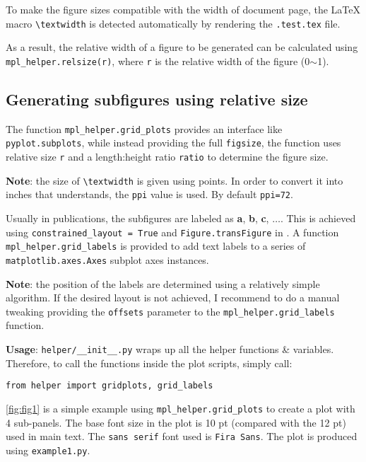 To make the figure sizes compatible with the width of document page,
the \LaTeX{} macro \verb|\textwidth| is detected automatically by
rendering the \verb|.test.tex| file.


{\allowbreak
  As a result, the relative width of a figure to be generated can be
calculated using \verb|mpl_helper.relsize(r)|, where \texttt{r} is the
relative width of the figure (0$\sim{}$1).
\par}

\subsection{Generating subfigures using relative size}
\label{sec:gener-subf}

The function \verb|mpl_helper.grid_plots| provides an interface like
\verb|pyplot.subplots|, while instead providing the full
\texttt{figsize}, the function uses relative size \texttt{r} and a
length:height ratio \texttt{ratio} to determine the figure size.

\textbf{Note}: the size of \verb|\textwidth| is given using points. In
order to convert it into inches that \mpl{} understands, the
\verb|ppi| value is used. By default \verb|ppi=72|.

Usually in publications, the subfigures are labeled as \textbf{a},
\textbf{b}, \textbf{c}, $\dots$. This is achieved using
\verb|constrained_layout = True| and \verb|Figure.transFigure| in
\mpl{}. A function \verb|mpl_helper.grid_labels| is provided to add
text labels to a series of \verb|matplotlib.axes.Axes| subplot axes
instances. 

\textbf{Note}: the position of the labels are determined using a
relatively simple algorithm. If the desired layout is not achieved, I
recommend to do a manual tweaking providing the \verb|offsets|
parameter to the \verb|mpl_helper.grid_labels| function.

\textbf{Usage}: \verb|helper/__init__.py| wraps up all the helper
functions \& variables. Therefore, to call the functions inside the
plot scripts, simply call:
\begin{verbatim}
from helper import gridplots, grid_labels
\end{verbatim}

\autoref{fig:fig1} is a simple example using
\verb|mpl_helper.grid_plots| to create a plot with 4 sub-panels. The
base font size in the plot is 10 pt (compared with the 12 pt) used in
main text. The \texttt{sans serif} font used is \texttt{Fira
  Sans}. The plot is produced using \verb|example1.py|.

